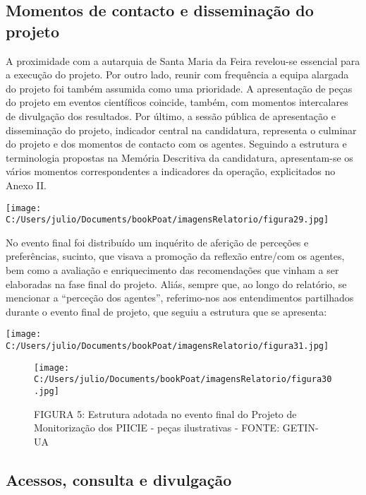\documentclass[
]{book}
\begin{document}
\hypertarget{momentos-de-contacto-e-disseminauxe7uxe3o-do-projeto}{%
\subsection{\texorpdfstring{\textbf{Momentos de contacto e disseminação do projeto}}{Momentos de contacto e disseminação do projeto}}\label{momentos-de-contacto-e-disseminauxe7uxe3o-do-projeto}}

A proximidade com a autarquia de Santa Maria da Feira revelou-se essencial para a execução do projeto. Por outro lado, reunir com frequência a equipa alargada do projeto foi também assumida como uma prioridade. A apresentação de peças do projeto em eventos científicos coincide, também, com momentos intercalares de divulgação dos resultados. Por último, a sessão pública de apresentação e disseminação do projeto, indicador central na candidatura, representa o culminar do projeto e dos momentos de contacto com os agentes. Seguindo a estrutura e terminologia propostas na Memória Descritiva da candidatura, apresentam-se os vários momentos correspondentes a indicadores da operação, explicitados no Anexo II.

\texttt{[image: C:/Users/julio/Documents/bookPoat/imagensRelatorio/figura29.jpg]}

No evento final foi distribuído um inquérito de aferição de perceções e preferências, sucinto, que visava a promoção da reflexão entre/com os agentes, bem como a avaliação e enriquecimento das recomendações que vinham a ser elaboradas na fase final do projeto. Aliás, sempre que, ao longo do relatório, se mencionar a ``perceção dos agentes'', referimo-nos aos entendimentos partilhados durante o evento final de projeto, que seguiu a estrutura que se apresenta:

\texttt{[image: C:/Users/julio/Documents/bookPoat/imagensRelatorio/figura31.jpg]}

\begin{figure}
\centering
\texttt{[image: C:/Users/julio/Documents/bookPoat/imagensRelatorio/figura30.jpg]}
\caption{FIGURA 5: Estrutura adotada no evento final do Projeto de Monitorização dos PIICIE - peças ilustrativas - FONTE: GETIN-UA}
\end{figure}

\hypertarget{acessos-consulta-e-divulgauxe7uxe3o}{%
\subsection{\texorpdfstring{\textbf{Acessos, consulta e divulgação}}{Acessos, consulta e divulgação}}\label{acessos-consulta-e-divulgauxe7uxe3o}}
\end{document}
